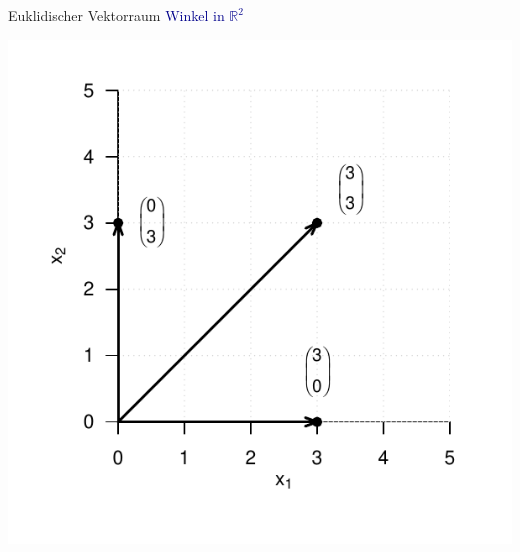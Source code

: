 \documentclass[
  8pt,
  ignorenonframetext,
]{beamer}
\begin{document}
\begin{frame}{Euklidischer Vektorraum}
\protect\hypertarget{euklidischer-vektorraum-9}{}
\textcolor{darkblue}{Winkel in $\mathbb{R}^2$}

\begin{center}\includegraphics[width=0.6\linewidth]{2_Abbildungen/mvda_2_winkel_R2} \end{center}
\end{frame}
\end{document}

